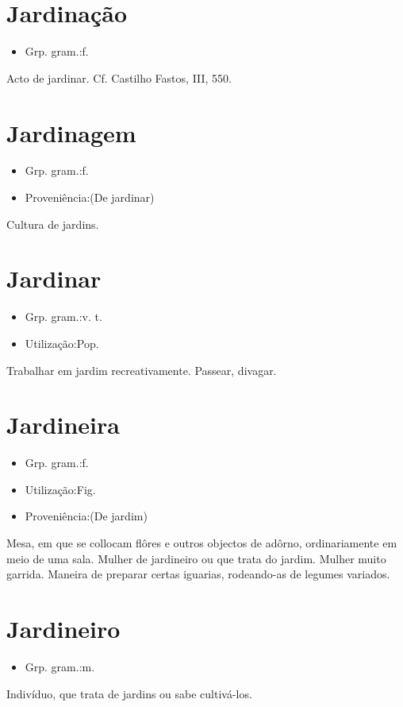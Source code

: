 \documentclass{article}
\begin{document}
\section{Jardinação}
\begin{itemize}
\item {Grp. gram.:f.}
\end{itemize}
Acto de jardinar. Cf. Castilho \textunderscore Fastos\textunderscore , III, 550.
\section{Jardinagem}
\begin{itemize}
\item {Grp. gram.:f.}
\end{itemize}
\begin{itemize}
\item {Proveniência:(De \textunderscore jardinar\textunderscore )}
\end{itemize}
Cultura de jardins.
\section{Jardinar}
\begin{itemize}
\item {Grp. gram.:v. t.}
\end{itemize}
\begin{itemize}
\item {Utilização:Pop.}
\end{itemize}
Trabalhar em jardim recreativamente.
Passear, divagar.
\section{Jardineira}
\begin{itemize}
\item {Grp. gram.:f.}
\end{itemize}
\begin{itemize}
\item {Utilização:Fig.}
\end{itemize}
\begin{itemize}
\item {Proveniência:(De \textunderscore jardim\textunderscore )}
\end{itemize}
Mesa, em que se collocam flôres e outros objectos de adôrno, ordinariamente em meio de uma sala.
Mulher de jardineiro ou que trata do jardim.
Mulher muito garrida.
Maneira de preparar certas iguarias, rodeando-as de legumes variados.
\section{Jardineiro}
\begin{itemize}
\item {Grp. gram.:m.}
\end{itemize}
Indivíduo, que trata de jardins ou sabe cultivá-los.
\end{document}
